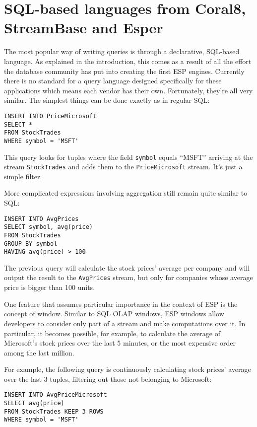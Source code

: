 \documentclass[twoside]{report}
\begin{document}
\section{SQL-based languages from Coral8, StreamBase and Esper}

The most popular way of writing queries is through a declarative, SQL-based language. As explained in the introduction, this comes as a result of all the effort the database community has put into creating the first ESP engines. Currently there is no standard for a query language designed specifically for these applications which means each vendor has their own. Fortunately, they're all very similar. The simplest things can be done exactly as in regular SQL:

\begin{verbatim}
INSERT INTO PriceMicrosoft
SELECT *
FROM StockTrades
WHERE symbol = 'MSFT'
\end{verbatim}

This query looks for tuples where the field \verb=symbol= equals ``MSFT'' arriving at the stream \verb=StockTrades= and adds them to the \verb=PriceMicrosoft= stream. It's just a simple filter.

More complicated expressions involving aggregation still remain quite similar to SQL:

\begin{verbatim}
INSERT INTO AvgPrices
SELECT symbol, avg(price)
FROM StockTrades
GROUP BY symbol
HAVING avg(price) > 100
\end{verbatim}

The previous query will calculate the stock prices' average per company and will output the result to the \verb=AvgPrices= stream, but only for companies whose average price is bigger than 100 units.

One feature that assumes particular importance in the context of ESP is the concept of window. Similar to SQL OLAP windows, ESP windows allow developers to consider only part of a stream and make computations over it. In particular, it becomes possible, for example, to calculate the average of Microsoft's stock prices over the last 5 minutes, or the most expensive order among the last million.

For example, the following query is continuously calculating stock prices' average over the last 3 tuples, filtering out those not belonging to Microsoft:

\begin{verbatim}
INSERT INTO AvgPriceMicrosoft
SELECT avg(price)
FROM StockTrades KEEP 3 ROWS
WHERE symbol = 'MSFT'
\end{verbatim}
\end{document}
